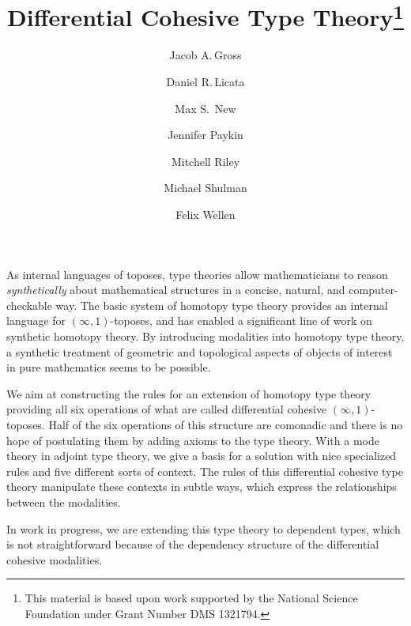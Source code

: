 \documentclass{article}
\title{Differential Cohesive Type Theory\thanks{This
    material is based upon work supported by the National Science Foundation
    under Grant Number DMS 1321794.}}
\author{Jacob A.\,Gross}
\affil[1]{University of Pittsburgh}
\author[2]{Daniel R.\,Licata}
\affil[2]{Wesleyan University}
\author[3]{Max S.\, New}
\affil[3]{Northeastern University}
\author[4]{Jennifer Paykin}
\affil[4]{University of Pennsylvania}
\author[2]{Mitchell Riley}
\author[5]{Michael Shulman}
\affil[5]{University of San Diego}
\author[6]{Felix Wellen}
\affil[6]{Karlsruhe Institute of Technology}
\date{}
\begin{document}
\maketitle

As internal languages of toposes, type theories allow mathematicians to
reason \emph{synthetically} about mathematical structures in a concise,
natural, and computer-checkable way.  
The basic system of homotopy type theory provides an internal language for
$(\infty,1)$-toposes, and has enabled a significant line of work on
synthetic homotopy theory. 
By introducing modalities into homotopy type theory,
a synthetic treatment of geometric and topological aspects 
of objects of interest in pure mathematics seems to be possible. 

We aim at constructing the rules for an extension of homotopy type theory
providing all six operations of what are called differential cohesive $(\infty,1)$-toposes.
Half of the six operations of this structure are comonadic and there is no hope of 
postulating them by adding axioms to the type theory.
With a mode theory in adjoint type theory, 
we give a basis for a solution with nice specialized rules
and five different sorts of context.
The rules of this differential
cohesive type theory manipulate these contexts in subtle ways, which express
the relationships between the modalities.

In work in progress, we are extending this type theory to dependent types, which
is not straightforward because of the dependency structure of the differential
cohesive modalities. 
\end{document}
